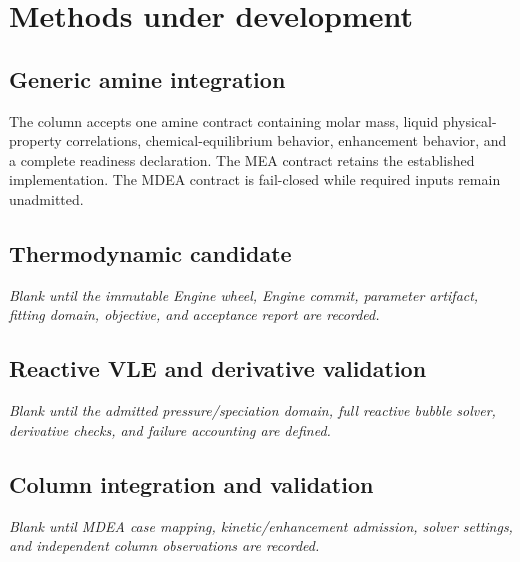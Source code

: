 \section{Methods under development}

\subsection{Generic amine integration}

The column accepts one amine contract containing molar mass, liquid physical-property
correlations, chemical-equilibrium behavior, enhancement behavior, and a complete readiness
declaration. The MEA contract retains the established implementation. The MDEA contract is
fail-closed while required inputs remain unadmitted.

\subsection{Thermodynamic candidate}

\textit{Blank until the immutable Engine wheel, Engine commit, parameter artifact, fitting
domain, objective, and acceptance report are recorded.}

\subsection{Reactive VLE and derivative validation}

\textit{Blank until the admitted pressure/speciation domain, full reactive bubble solver,
derivative checks, and failure accounting are defined.}

\subsection{Column integration and validation}

\textit{Blank until MDEA case mapping, kinetic/enhancement admission, solver settings, and
independent column observations are recorded.}
